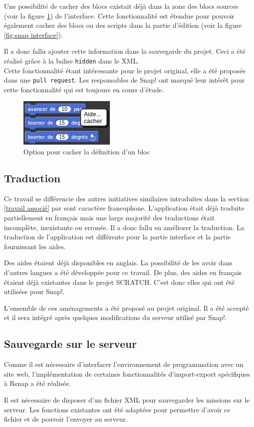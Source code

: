 Une possibilité de cacher des blocs existait déjà dans la zone des blocs sources (voir la figure \ref{fig:cacher}) de l'interface. Cette fonctionnalité est étendue pour pouvoir également cacher des blocs ou des scripts dans la partie d'édition (voir la figure \ref{fig:snap interface}).

Il a donc fallu ajouter cette information dans la sauvegarde du projet. Ceci a été réalisé grâce à la balise \texttt{hidden} dans le XML.\\


Cette fonctionnalité étant intéressante pour le projet original, elle a été proposée dans une \texttt{pull request}. Les responsables de Snap! ont marqué leur intérêt pour cette fonctionnalité qui est toujours en cours d'étude.
\begin{figure}
  \begin{center}
    \includegraphics[scale=0.5]{content/7-solution/2-snap/images/cacher}
    \caption{Option pour cacher la définition d'un bloc}
    \label{fig:cacher}
  \end{center}
\end{figure}

\subsection{Traduction}
Ce travail se différencie des autres initiatives similaires introduites dans la section \ref{travail associé} par sont caractère francophone. L'application était déjà traduite partiellement en français mais une large majorité des traductions était incomplète, inexistante ou erronée. Il a donc fallu en améliorer la traduction. La traduction de l'application est différente pour la partie interface et la partie fournissant les aides. 

Des aides étaient déjà disponibles en anglais. La possibilité de les avoir dans d'autres langues a été développée pour ce travail. De plus, des aides en français étaient déjà existantes dans le projet SCRATCH. C'est donc elles qui ont été utilisées pour Snap!.

L'ensemble de ces aménagements a été proposé au projet original. Il a été accepté et il sera intégré après quelques modifications du serveur utilisé par Snap!.

\subsection{Sauvegarde sur le serveur}
Comme il est nécessaire d'interfacer l'environnement de programmation avec un site web, l'implémentation de certaines fonctionnalités d'import-export spécifiques à Rsnap a été réalisée.

Il est nécessaire de disposer d'un fichier XML pour sauvegarder les missions sur le serveur. Les fonctions existantes ont été adaptées pour permettre d'avoir ce fichier et de pouvoir l'envoyer au serveur.
